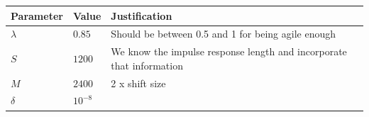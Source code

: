 \documentclass[11pt]{article}
\begin{document}
\begin{longtable}[]{@{}lll@{}}
\toprule
\begin{minipage}[b]{0.30\columnwidth}\raggedright
Parameter\strut
\end{minipage} & \begin{minipage}[b]{0.30\columnwidth}\raggedright
Value\strut
\end{minipage} & \begin{minipage}[b]{0.30\columnwidth}\raggedright
Justification\strut
\end{minipage}\tabularnewline
\midrule
\endhead
\begin{minipage}[t]{0.30\columnwidth}\raggedright
\(\lambda\)\strut
\end{minipage} & \begin{minipage}[t]{0.30\columnwidth}\raggedright
\(0.85\)\strut
\end{minipage} & \begin{minipage}[t]{0.30\columnwidth}\raggedright
Should be between 0.5 and 1 for being agile enough\strut
\end{minipage}\tabularnewline
\begin{minipage}[t]{0.30\columnwidth}\raggedright
\(S\)\strut
\end{minipage} & \begin{minipage}[t]{0.30\columnwidth}\raggedright
\(1200\)\strut
\end{minipage} & \begin{minipage}[t]{0.30\columnwidth}\raggedright
We know the impulse response length and incorporate that
information\strut
\end{minipage}\tabularnewline
\begin{minipage}[t]{0.30\columnwidth}\raggedright
\(M\)\strut
\end{minipage} & \begin{minipage}[t]{0.30\columnwidth}\raggedright
\(2400\)\strut
\end{minipage} & \begin{minipage}[t]{0.30\columnwidth}\raggedright
2 x shift size\strut
\end{minipage}\tabularnewline
\begin{minipage}[t]{0.30\columnwidth}\raggedright
\(\delta\)\strut
\end{minipage} & \begin{minipage}[t]{0.30\columnwidth}\raggedright
\(10^{-8}\)\strut
\end{minipage} & \begin{minipage}[t]{0.30\columnwidth}\raggedright

\end{minipage}
\end{longtable}
\end{document}
